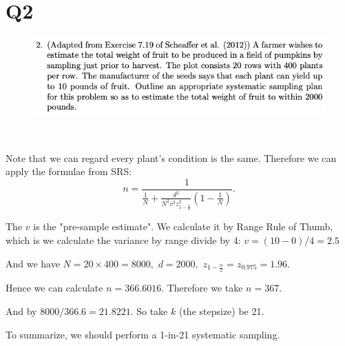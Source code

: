 \documentclass[12pt]{article}%
\begin{document}
\newpage
\section{Q2}
\begin{figure}[htp]
    \centering %
    \includegraphics[width = 15cm]{img/Q2.png}
\end{figure}

~\ 

Note that we can regard every plant's condition is the same. Therefore we can apply the 
formulae from SRS: $$n=\frac{1}{\frac{1}{N} + 
\frac{d^2}{N^2v^2z_{1-\frac{\alpha}{2}}^2}(1-\frac{1}{N})}.$$

The $v$ is the "pre-sample estimate". We calculate it by Range Rule of Thumb, which is 
we calculate the variance by range divide by 4: $v=(10-0)/4=2.5$

And we have $N=20\times 400 = 8000,$ $d=2000,$ $z_{1-\frac{\alpha}{2}}=z_{0.975}=1.96.$

Hence we can calculate $n=366.6016.$ Therefore we take $n=367.$

And by $8000/366.6=21.8221.$ So take $k$ (the stepsize) be 21. 

To summarize, we should perform a 1-in-21 systematic sampling.


\newpage
\end{document}
